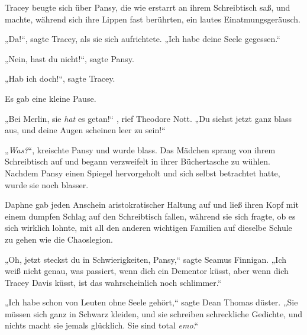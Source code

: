 Tracey beugte sich über Pansy, die wie erstarrt an ihrem Schreibtisch saß, und machte, während sich ihre Lippen fast berührten, ein lautes Einatmungsgeräusch.

„Da!“, sagte Tracey, als sie sich aufrichtete. „Ich habe deine Seele gegessen.“

„Nein, hast du nicht!“, sagte Pansy.

„Hab ich doch!“, sagte Tracey.

Es gab eine kleine Pause.

„Bei Merlin, sie \emph{hat} es getan!“ , rief Theodore Nott. „Du siehst jetzt ganz blass aus, und deine Augen scheinen leer zu sein!“

„\emph{Was?}“, kreischte Pansy und wurde blass. Das Mädchen sprang von ihrem Schreibtisch auf und begann verzweifelt in ihrer Büchertasche zu wühlen. Nachdem Pansy einen Spiegel hervorgeholt und sich selbst betrachtet hatte, wurde sie noch blasser.

Daphne gab jeden Anschein aristokratischer Haltung auf und ließ ihren Kopf mit einem dumpfen Schlag auf den Schreibtisch fallen, während sie sich fragte, ob es sich wirklich lohnte, mit all den anderen wichtigen Familien auf dieselbe Schule zu gehen wie die Chaoslegion.

„Oh, jetzt steckst du in Schwierigkeiten, Pansy,“ sagte Seamus Finnigan. „Ich weiß nicht genau, was passiert, wenn dich ein Dementor küsst, aber wenn dich Tracey Davis küsst, ist das wahrscheinlich noch schlimmer.“

„Ich habe schon von Leuten ohne Seele gehört,“ sagte Dean Thomas düster. „Sie müssen sich ganz in Schwarz kleiden, und sie schreiben schreckliche Gedichte, und nichts macht sie jemals glücklich. Sie sind total \emph{emo}.“

